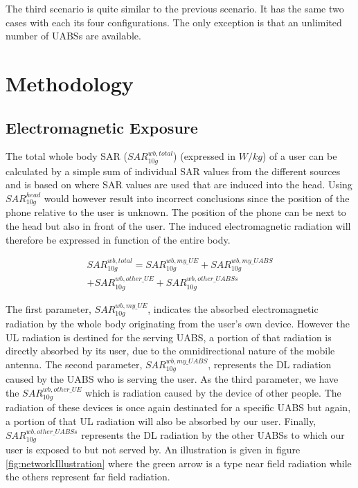 \documentclass[twocolumn]{phdsymp} %
\begin{document}
The third scenario is quite similar to the previous scenario. It has the same 
two cases with each its four configurations. The only exception is that an unlimited number of UABSs are available.

\section{Methodology}

\subsection{Electromagnetic Exposure}


The total whole body SAR ($SAR^{wb,total}_{10g}$) (expressed in $W/kg$) of a user can be calculated by a simple sum of individual SAR values from the different sources
and is based on \cite{J17_kuehn2019modelling} where SAR values are used that are induced into the head.
Using $SAR^{head}_{10g}$ would however result into incorrect conclusions since 
the position of the phone relative to the user is unknown. 
The position of the phone can be next to the head but also in front of the user.
The induced electromagnetic radiation will therefore be expressed in function of the entire body.


\begin{equation} 
\begin{aligned}
SAR^{wb,total}_{10g} = SAR^{wb,my\_UE}_{10g} +  SAR^{wb,my\_UABS}_{10g} \\
+ SAR^{wb,other\_UE}_{10g} + SAR^{wb,other\_UABSs}_{10g}
\end{aligned}
\label{eq:overallSARwb}
\end{equation}

The first parameter, $SAR^{wb,my\_UE}_{10g}$, indicates the absorbed electromagnetic radiation by the whole body originating from the user's own device.
 However the 
\gls{UL} radiation is destined for the serving \gls{UABS}, a portion of that radiation is directly absorbed by its user, due to the omnidirectional nature of the mobile 
antenna.
The second parameter, $SAR^{wb,my\_UABS}_{10g}$, represents the \gls{DL} radiation caused by the \gls{UABS} who is serving the user.
As the third parameter, we have the $SAR^{wb,other\_UE}_{10g}$ which is radiation caused by the device of other people. The radiation of these devices is once again 
destinated for a specific \gls{UABS} but again, a portion of that \gls{UL} radiation will also be absorbed by our user.
Finally, $SAR^{wb,other\_UABSs}_{10g}$ represents the \gls{DL} radiation by the other UABSs to which our user is exposed to but not served by.
An illustration is given in figure \ref{fig:networkIllustration} where the green arrow is a type near field radiation while 
the others represent far field radiation.
\end{document}
